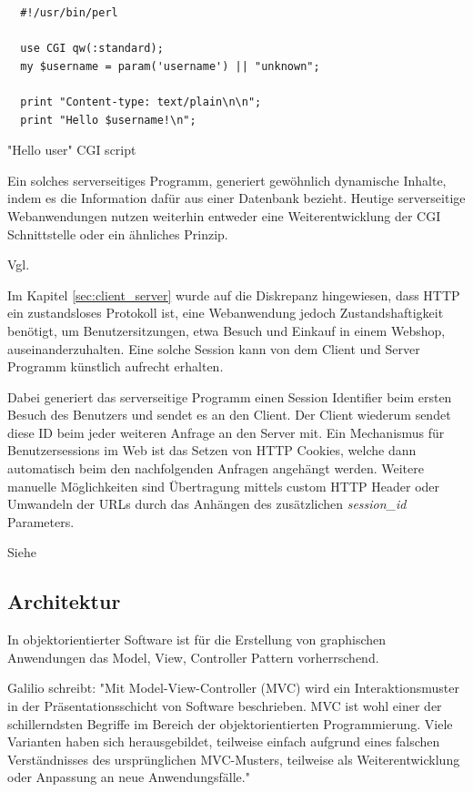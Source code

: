 \begin{listing}[H]
\begin{verbatim}
  #!/usr/bin/perl
  
  use CGI qw(:standard);
  my $username = param('username') || "unknown";
  
  print "Content-type: text/plain\n\n";
  print "Hello $username!\n";
\end{verbatim}
\caption{"Hello user" CGI script}
\label{lst:hello_pl}
\end{listing} 

Ein solches serverseitiges Programm, generiert gewöhnlich dynamische Inhalte, indem es die Information dafür aus einer Datenbank bezieht. Heutige serverseitige Webanwendungen nutzen weiterhin entweder eine Weiterentwicklung der CGI Schnittstelle oder ein ähnliches Prinzip.

Vgl. \citep[Kap. 1.1]{bekman}

Im Kapitel \ref{sec:client_server} wurde auf die Diskrepanz hingewiesen, dass HTTP ein zustandsloses Protokoll ist, eine Webanwendung jedoch Zustandshaftigkeit benötigt, um Benutzersitzungen, etwa Besuch und Einkauf in einem Webshop, auseinanderzuhalten. Eine solche Session kann von dem Client und Server Programm
künstlich aufrecht erhalten.

Dabei generiert das serverseitige Programm einen Session Identifier beim ersten Besuch des Benutzers und sendet es an den Client. Der Client wiederum sendet diese  ID beim jeder weiteren Anfrage an den Server mit. Ein Mechanismus für Benutzersessions im Web ist das Setzen von HTTP Cookies, welche dann automatisch beim den nachfolgenden Anfragen angehängt werden. Weitere manuelle Möglichkeiten sind  Übertragung mittels custom HTTP Header oder Umwandeln der URLs durch das Anhängen des zusätzlichen \emph{session\_id} Parameters.

Siehe \citep[Stateful Web Applications]{launchschool}  

\subsection{Architektur}

In objektorientierter Software ist für die Erstellung von graphischen Anwendungen das Model, View, Controller Pattern vorherrschend.

Galilio schreibt: "Mit Model-View-Controller (MVC) wird ein Interaktionsmuster in der Präsentationsschicht von Software beschrieben. MVC ist wohl einer der schillerndsten Begriffe im Bereich der objektorientierten Programmierung. Viele Varianten haben sich herausgebildet, teilweise einfach aufgrund eines falschen Verständnisses des ursprünglichen MVC-Musters, teilweise als Weiterentwicklung oder Anpassung an neue Anwendungsfälle."

